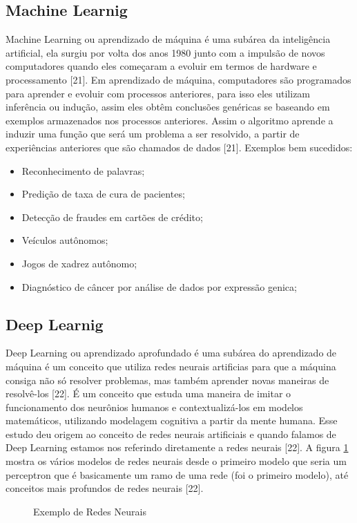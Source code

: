 \subsection{Machine Learnig}
Machine Learning ou aprendizado de máquina é uma subárea da inteligência artificial, ela surgiu por volta dos anos 1980 junto com a impulsão de novos computadores quando eles começaram a evoluir em termos de hardware e processamento [21]. Em aprendizado de máquina, computadores são programados para aprender e evoluir com processos anteriores, para isso eles utilizam inferência ou indução, assim eles obtêm conclusões genéricas se baseando em exemplos armazenados nos processos anteriores. Assim o algoritmo aprende a induzir uma função que será um problema a ser resolvido, a partir de experiências anteriores que são chamados de dados [21]. Exemplos bem sucedidos:
\begin{itemize}
    \item Reconhecimento de palavras;
    \item Predição de taxa de cura de pacientes;
    \item Detecção de fraudes em cartões de crédito;
    \item Veículos autônomos;
    \item Jogos de xadrez autônomo;
    \item Diagnóstico de câncer por análise de dados por expressão genica;
\end{itemize}
\subsection{Deep Learnig}
Deep Learning ou aprendizado aprofundado é uma subárea do aprendizado de máquina é um conceito que utiliza redes neurais artificias para que a máquina consiga não só resolver problemas, mas também aprender novas maneiras de resolvê-los [22].  É um conceito que estuda uma maneira de imitar o funcionamento dos neurônios humanos e contextualizá-los em modelos matemáticos, utilizando modelagem cognitiva a partir da mente humana. Esse estudo deu origem ao conceito de redes neurais artificiais e quando falamos de Deep Learning estamos nos referindo diretamente a redes neurais [22].
A figura \ref{fig:exRedeNeural} mostra os vários modelos de redes neurais desde o primeiro modelo que seria um perceptron que é basicamente um ramo de uma rede (foi o primeiro modelo), até conceitos mais profundos de redes neurais [22].

%
\begin{figure}[H]
	\centering
	\caption{Exemplo de Redes Neurais}
	\def\svgwidth{14cm}
	
	\label{fig:exRedeNeural}
\end{figure}

